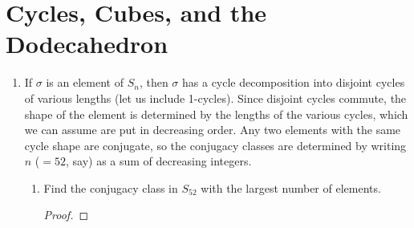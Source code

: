 \documentclass[../psets.tex]{subfiles}
\begin{document}
\section{Cycles, Cubes, and the Dodecahedron}
\begin{enumerate}
    \item {}If $\sigma$ is an element of $S_n$, then $\sigma$ has a cycle decomposition into disjoint cycles of various lengths (let us include 1-cycles). Since disjoint cycles commute, the shape of the element is determined by the lengths of the various cycles, which we can assume are put in decreasing order. Any two elements with the same cycle shape are conjugate, so the conjugacy classes are determined by writing $n$ ($=52$, say) as a sum of decreasing integers.
    \begin{enumerate}
        \item Find the conjugacy class in $S_{52}$ with the largest number of elements.
        \begin{proof}

\end{proof}
\end{enumerate}
\end{enumerate}
\end{document}
